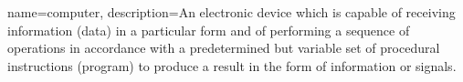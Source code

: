  {
	name={computer}, 
	description={An electronic device which is capable of receiving information (data) in a particular form and of performing a sequence of operations in accordance with a predetermined but variable set of procedural instructions (program) to produce a result in the form of information or signals.}
}
\glsaddall